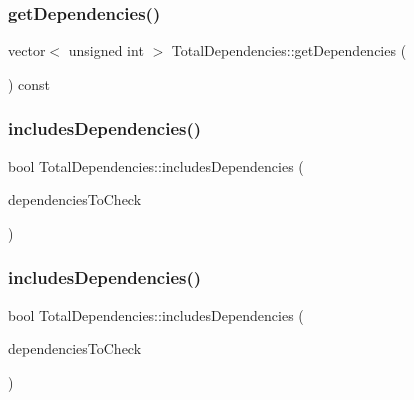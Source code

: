 \subsubsection{\texorpdfstring{get\+Dependencies()}{getDependencies()}}
{\footnotesize\ttfamily vector$<$ unsigned int $>$ Total\+Dependencies\+::get\+Dependencies (\begin{DoxyParamCaption}{ }\end{DoxyParamCaption}) const}

\mbox{\label{class_total_dependencies_a66aebb100cbce0faf5551fd74b0de0d8}} 
\subsubsection{\texorpdfstring{includes\+Dependencies()}{includesDependencies()}\hspace{0.1cm}{\footnotesize\ttfamily [1/2]}}
{\footnotesize\ttfamily bool Total\+Dependencies\+::includes\+Dependencies (\begin{DoxyParamCaption}\item[{const \hyperlink{class_total_dependencies}{Total\+Dependencies} \&}]{dependencies\+To\+Check }\end{DoxyParamCaption})}

\mbox{\label{class_total_dependencies_aed1c3ce4bee031ca9341d8ce4a179ef0}} 
\subsubsection{\texorpdfstring{includes\+Dependencies()}{includesDependencies()}\hspace{0.1cm}{\footnotesize\ttfamily [2/2]}}
{\footnotesize\ttfamily bool Total\+Dependencies\+::includes\+Dependencies (\begin{DoxyParamCaption}\item[{const vector$<$ \hyperlink{structures_8h_a83a1d9a070efa5341da84cfd8e28d3e5}{id\+Msg} $>$ \&}]{dependencies\+To\+Check }\end{DoxyParamCaption})}

